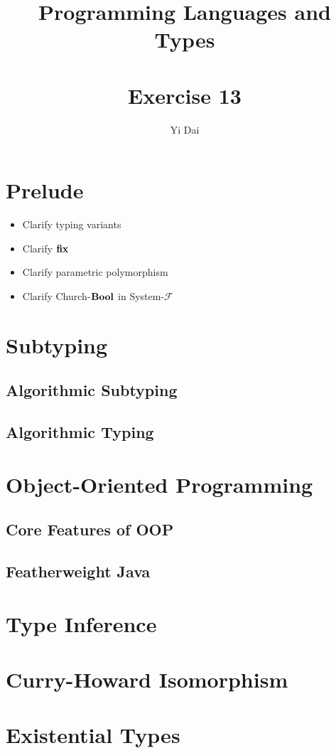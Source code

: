 \documentclass[a4paper,12pt]{article}
\title{
 Programming Languages and Types \\~\\
 \textbf{Exercise 13}
}
\author{
 Yi Dai
}
\begin{document}
\maketitle

\section{Prelude}

\begin{itemize}
 \item Clarify typing variants
 \item Clarify $\textbf{fix}$
 \item Clarify parametric polymorphism
 \item Clarify Church-$\textbf{Bool}$ in System-$\mathcal{F}$
\end{itemize}

\section{Subtyping}

\subsection{Algorithmic Subtyping}

\subsection{Algorithmic Typing}

\section{Object-Oriented Programming}

\subsection{Core Features of OOP}

\subsection{Featherweight Java}

\section{Type Inference}

\section{Curry-Howard Isomorphism}

\section{Existential Types}
\end{document}
